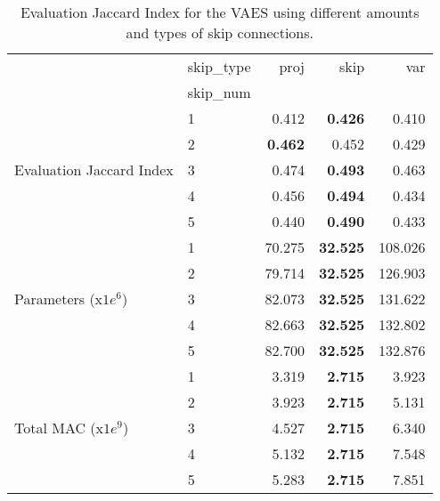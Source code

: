 \begin{table}[ht]
\centering
\caption{Evaluation Jaccard Index for the VAES using different amounts and types of skip connections.}
\label{tab:skip_results}
\begin{tabular}{llrrr}
\toprule
 & skip\_type & proj & skip & var \\
 & skip\_num &  &  &  \\
\midrule
\multirow[c]{5}{*}{Evaluation Jaccard Index} & 1 & 0.412 & \textbf{0.426} & 0.410 \\
 & 2 & \textbf{0.462} & 0.452 & 0.429 \\
 & 3 & 0.474 & \textbf{0.493} & 0.463 \\
 & 4 & 0.456 & \textbf{0.494} & 0.434 \\
 & 5 & 0.440 & \textbf{0.490} & 0.433 \\
\multirow[c]{5}{*}{Parameters (x$1e^6$)} & 1 & 70.275 & \textbf{32.525} & 108.026 \\
 & 2 & 79.714 & \textbf{32.525} & 126.903 \\
 & 3 & 82.073 & \textbf{32.525} & 131.622 \\
 & 4 & 82.663 & \textbf{32.525} & 132.802 \\
 & 5 & 82.700 & \textbf{32.525} & 132.876 \\
\multirow[c]{5}{*}{Total MAC (x$1e^9$)} & 1 & 3.319 & \textbf{2.715} & 3.923 \\
 & 2 & 3.923 & \textbf{2.715} & 5.131 \\
 & 3 & 4.527 & \textbf{2.715} & 6.340 \\
 & 4 & 5.132 & \textbf{2.715} & 7.548 \\
 & 5 & 5.283 & \textbf{2.715} & 7.851 \\
\bottomrule
\end{tabular}
\end{table}
